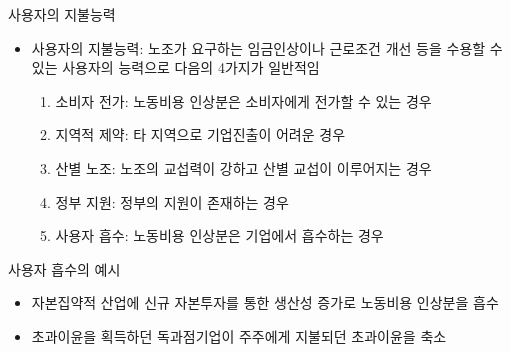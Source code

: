 \documentclass[aspectratio=169,xcolor=dvipsnames,handout]{beamer}
\begin{document}
\begin{frame}{사용자의 지불능력}
    \begin{itemize}[<+->]
        \item 사용자의 지불능력: 노조가 요구하는 임금인상이나 근로조건 개선 등을 수용할 수 있는 사용자의 능력으로 다음의 4가지가 일반적임
        \begin{enumerate}[<+->]
            \item 소비자 전가: 노동비용 인상분은 소비자에게 전가할 수 있는 경우
            \item 지역적 제약: 타 지역으로 기업진출이 어려운 경우
            \item 산별 노조: 노조의 교섭력이 강하고 산별 교섭이 이루어지는 경우
            \item 정부 지원: 정부의 지원이 존재하는 경우
            \item 사용자 흡수: 노동비용 인상분은 기업에서 흡수하는 경우
        \end{enumerate}
    \end{itemize}
    \begin{exampleblock}{사용자 흡수의 예시}
        \begin{itemize}[<+->]
            \item 자본집약적 산업에 신규 자본투자를 통한 생산성 증가로 노동비용 인상분을 흡수
            \item 초과이윤을 획득하던 독과점기업이 주주에게 지불되던 초과이윤을 축소
        \end{itemize}
    \end{exampleblock}
\end{frame}
\end{document}

